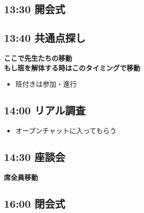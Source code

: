 \subsection*{13:30 開会式}

\subsection*{13:40 共通点探し}
\textbf{ここで先生たちの移動 \\もし班を解体する時はこのタイミングで移動}
\begin{itemize}
  \item 班付きは参加・進行
\end{itemize}

\subsection*{14:00 リアル調査}
\begin{itemize}
  \item オープンチャットに入ってもらう
\end{itemize}

\subsection*{14:30 座談会}
\textbf{席全員移動}


\subsection*{16:00 閉会式}